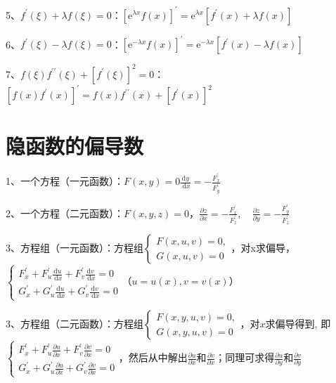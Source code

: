 5、$ f^{\prime}(\xi)+\lambda f(\xi)=0 $：$ \left[\mathrm{e}^{\lambda x} f(x)\right]^{\prime}=\mathrm{e}^{\lambda x}\left[f^{\prime}(x)+\lambda f(x)\right] $

6、$ f^{\prime}(\xi)-\lambda f(\xi)=0 $：$ \left[\mathrm{e}^{-\lambda x} f(x)\right]^{\prime}=\mathrm{e}^{-\lambda x}\left[f^{\prime}(x)-\lambda f(x)\right] $

7、$ f(\xi) f^{\prime \prime}(\xi)+\left[f^{\prime}(\xi)\right]^{2}=0 $：$ \left[f(x) f^{\prime}(x)\right]^{\prime}=f(x) f^{\prime \prime}(x)+\left[f^{\prime}(x)\right]^{2} $

\section{隐函数的偏导数}

1、一个方程（一元函数）：$ F(x, y)=0 $$ \frac{\mathrm{d} y}{\mathrm{~d} x}=-\frac{F_{x}^{\prime}}{F_{y}^{\prime}} $

2、一个方程（二元函数）：$ F(x, y, z)=0 $，$ \frac{\partial z}{\partial x}=-\frac{F_{x}^{\prime}}{F_{z}^{\prime}}, \quad \frac{\partial z}{\partial y}=-\frac{F_{y}^{\prime}}{F_{z}^{\prime}} $

3、方程组（一元函数）：方程组$ \left\{\begin{array}{l}F(x, u, v)=0,  \\ G(x, u, v)=0\end{array}\right.  $，对x求偏导，$ \left\{\begin{array}{l} F_{x}^{\prime}+F_{u}^{\prime} \frac{\mathrm{d} u}{\mathrm{~d} x}+F_{v}^{\prime} \frac{\mathrm{d} v}{\mathrm{~d} x}=0 \\ G_{x}^{\prime}+G_{u}^{\prime} \frac{\mathrm{d} u}{\mathrm{~d} x}+G_{v}^{\prime} \frac{\mathrm{d} v}{\mathrm{~d} x}=0 \end{array}\right. $（$ u=u(x), v=v(x) $）

3、方程组（二元函数）：方程组$ \left\{\begin{array}{l}F(x, y, u, v)=0, \\ G(x, y, u, v)=0\end{array}\right. $，对$ x $求偏导得到, 即$ \left\{\begin{array}{l} F_{x}^{\prime}+F_{u}^{\prime} \frac{\partial u}{\partial x}+F_{v}^{\prime} \frac{\partial v}{\partial x}=0 \\ G_{x}^{\prime}+G_{u}^{\prime} \frac{\partial u}{\partial x}+G_{v}^{\prime} \frac{\partial v}{\partial x}=0 \end{array}\right. $，然后从中解出$ \frac{\partial u}{\partial x} $和$ \frac{\partial v}{\partial x} $；同理可求得$ \frac{\partial u}{\partial y} $和$ \frac{\partial v}{\partial y} $

